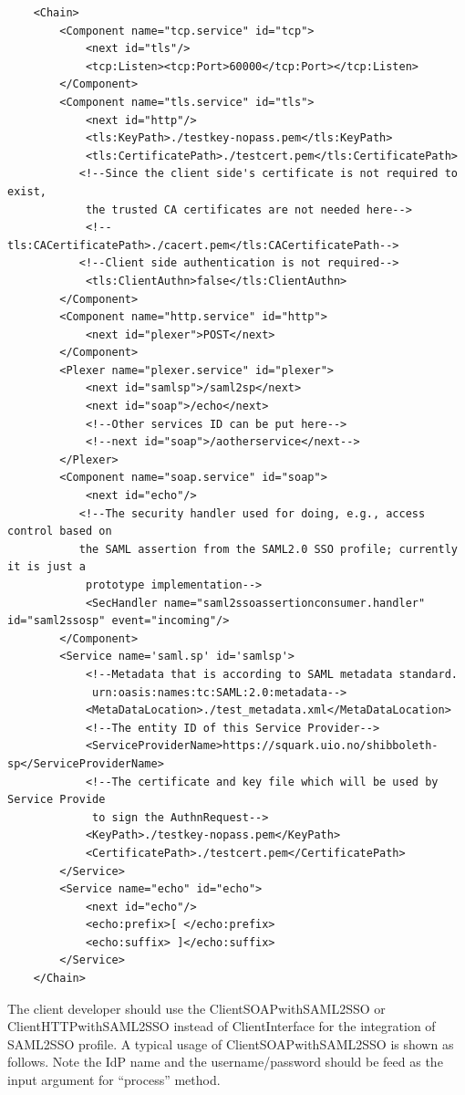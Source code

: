 \documentclass{article}                            %
\begin{document}
\begin{verbatim}
    <Chain>
        <Component name="tcp.service" id="tcp"> 
            <next id="tls"/> 
            <tcp:Listen><tcp:Port>60000</tcp:Port></tcp:Listen> 
        </Component> 
        <Component name="tls.service" id="tls"> 
            <next id="http"/> 
            <tls:KeyPath>./testkey-nopass.pem</tls:KeyPath> 
            <tls:CertificatePath>./testcert.pem</tls:CertificatePath>
           <!--Since the client side's certificate is not required to exist, 
            the trusted CA certificates are not needed here-->
            <!--tls:CACertificatePath>./cacert.pem</tls:CACertificatePath--> 
           <!--Client side authentication is not required-->
            <tls:ClientAuthn>false</tls:ClientAuthn> 
        </Component> 
        <Component name="http.service" id="http"> 
            <next id="plexer">POST</next> 
        </Component> 
        <Plexer name="plexer.service" id="plexer"> 
            <next id="samlsp">/saml2sp</next> 
            <next id="soap">/echo</next>
            <!--Other services ID can be put here-->
            <!--next id="soap">/aotherservice</next-->
        </Plexer> 
        <Component name="soap.service" id="soap"> 
            <next id="echo"/> 
           <!--The security handler used for doing, e.g., access control based on 
           the SAML assertion from the SAML2.0 SSO profile; currently it is just a 
            prototype implementation-->
            <SecHandler name="saml2ssoassertionconsumer.handler" id="saml2ssosp" event="incoming"/> 
        </Component> 
        <Service name='saml.sp' id='samlsp'>
            <!--Metadata that is according to SAML metadata standard. 
             urn:oasis:names:tc:SAML:2.0:metadata-->
            <MetaDataLocation>./test_metadata.xml</MetaDataLocation> 
            <!--The entity ID of this Service Provider-->
            <ServiceProviderName>https://squark.uio.no/shibboleth-sp</ServiceProviderName>
            <!--The certificate and key file which will be used by Service Provide 
             to sign the AuthnRequest-->
            <KeyPath>./testkey-nopass.pem</KeyPath> 
            <CertificatePath>./testcert.pem</CertificatePath> 
        </Service> 
        <Service name="echo" id="echo"> 
            <next id="echo"/> 
            <echo:prefix>[ </echo:prefix> 
            <echo:suffix> ]</echo:suffix> 
        </Service> 
    </Chain> 
\end{verbatim}
 
    The client developer should use the ClientSOAPwithSAML2SSO  or ClientHTTPwithSAML2SSO instead of ClientInterface for the integration of SAML2SSO profile. A typical usage of ClientSOAPwithSAML2SSO is shown as follows. Note the IdP name and the username/password should be feed as the input argument for ``process'' method.
\end{document}
